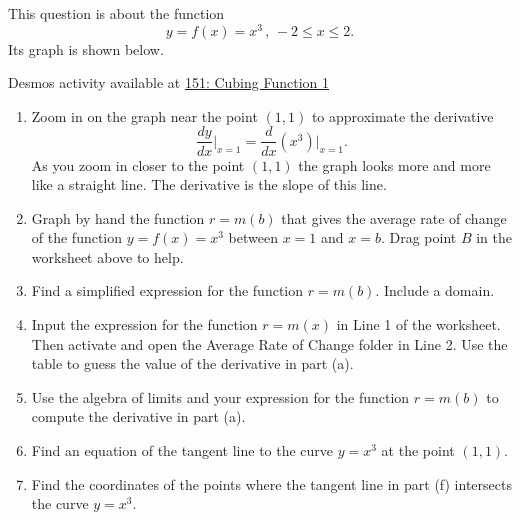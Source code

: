 \documentclass{ximera}
\begin{document}
\begin{example} \label{ExLdm221}
This question is about the function
\[
    y = f(x) = x^3 \, , \, -2\leq x \leq 2.
\]
Its graph is shown below.

\begin{onlineOnly}
    \begin{center}
\end{center}
\end{onlineOnly}

Desmos activity available at
\href{https://www.desmos.com/calculator/bb5oac9pik}{151: Cubing Function 1}

\begin{enumerate}
\item Zoom in on the graph near the point $(1,1)$ to approximate the derivative 
\[
      \frac{dy}{dx} \Big|_{x=1} = \frac{d}{dx}\left( x^3\right)\Big|_{x=1}.
\]
As you zoom in closer to the point $(1,1)$ the graph looks more and more like a straight line. The derivative is the slope of this line.

\item Graph by hand the function  $r=m(b)$ that gives the average rate of change of the function $y=f(x)=x^3$ between $x=1$ and $x=b$. Drag point $B$ in the worksheet above to help.

\item Find a simplified expression for the function $r=m(b)$. Include a domain.

\item Input the expression for the function $r=m(x)$ in Line 1 of the worksheet. Then activate and open the Average Rate of Change folder in Line 2. Use the table to guess the value of the derivative in part (a).

\item Use the algebra of limits and your expression for the function $r=m(b)$ to compute the derivative in part (a).

\item Find an equation of the tangent line to the curve $y=x^3$ at the point $(1,1)$.

\item Find the coordinates of the points where the tangent line in part (f) intersects the curve $y=x^3$.


\end{enumerate}
\end{example}
\end{document}
